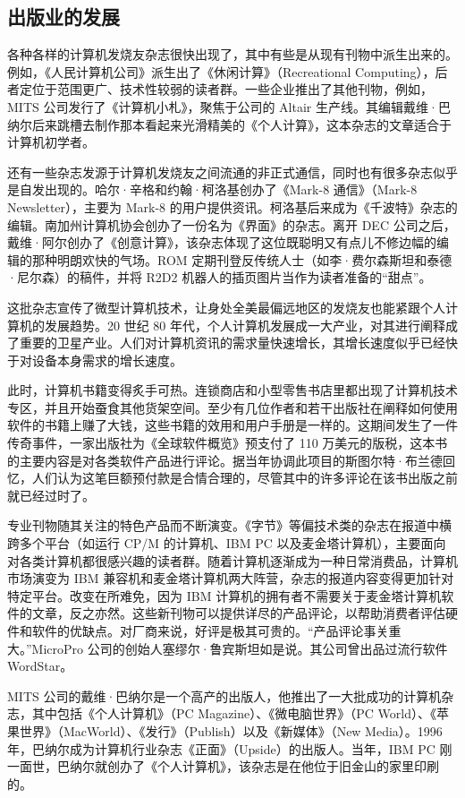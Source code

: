 \documentclass[12pt,UTF8]{ctexbook}
\begin{document}
\subsection{出版业的发展}


各种各样的计算机发烧友杂志很快出现了，其中有些是从现有刊物中派生出来的。例如，《人民计算机公司》派生出了《休闲计算》（Recreational Computing），后者定位于范围更广、技术性较弱的读者群。一些企业推出了其他刊物，例如，MITS 公司发行了《计算机小札》，聚焦于公司的 Altair 生产线。其编辑戴维·巴纳尔后来跳槽去制作那本看起来光滑精美的《个人计算》，这本杂志的文章适合于计算机初学者。

还有一些杂志发源于计算机发烧友之间流通的非正式通信，同时也有很多杂志似乎是自发出现的。哈尔·辛格和约翰·柯洛基创办了《Mark-8 通信》（Mark-8 Newsletter），主要为 Mark-8 的用户提供资讯。柯洛基后来成为《千波特》杂志的编辑。南加州计算机协会创办了一份名为《界面》的杂志。离开 DEC 公司之后，戴维·阿尔创办了《创意计算》，该杂志体现了这位既聪明又有点儿不修边幅的编辑的那种明朗欢快的气场。ROM 定期刊登反传统人士（如李·费尔森斯坦和泰德·尼尔森）的稿件，并将 R2D2 机器人的插页图片当作为读者准备的“甜点”。

这批杂志宣传了微型计算机技术，让身处全美最偏远地区的发烧友也能紧跟个人计算机的发展趋势。20 世纪 80 年代，个人计算机发展成一大产业，对其进行阐释成了重要的卫星产业。人们对计算机资讯的需求量快速增长，其增长速度似乎已经快于对设备本身需求的增长速度。

此时，计算机书籍变得炙手可热。连锁商店和小型零售书店里都出现了计算机技术专区，并且开始蚕食其他货架空间。至少有几位作者和若干出版社在阐释如何使用软件的书籍上赚了大钱，这些书籍的效用和用户手册是一样的。这期间发生了一件传奇事件，一家出版社为《全球软件概览》预支付了 110 万美元的版税，这本书的主要内容是对各类软件产品进行评论。据当年协调此项目的斯图尔特·布兰德回忆，人们认为这笔巨额预付款是合情合理的，尽管其中的许多评论在该书出版之前就已经过时了。

专业刊物随其关注的特色产品而不断演变。《字节》等偏技术类的杂志在报道中横跨多个平台（如运行 CP/M 的计算机、IBM PC 以及麦金塔计算机），主要面向对各类计算机都很感兴趣的读者群。随着计算机逐渐成为一种日常消费品，计算机市场演变为 IBM 兼容机和麦金塔计算机两大阵营，杂志的报道内容变得更加针对特定平台。改变在所难免，因为 IBM 计算机的拥有者不需要关于麦金塔计算机软件的文章，反之亦然。这些新刊物可以提供详尽的产品评论，以帮助消费者评估硬件和软件的优缺点。对厂商来说，好评是极其可贵的。“产品评论事关重大。”MicroPro 公司的创始人塞缪尔·鲁宾斯坦如是说。其公司曾出品过流行软件 WordStar。

MITS 公司的戴维·巴纳尔是一个高产的出版人，他推出了一大批成功的计算机杂志，其中包括《个人计算机》（PC Magazine）、《微电脑世界》（PC World）、《苹果世界》（MacWorld）、《发行》（Publish）以及《新媒体》（New Media）。1996 年，巴纳尔成为计算机行业杂志《正面》（Upside）的出版人。当年，IBM PC 刚一面世，巴纳尔就创办了《个人计算机》，该杂志是在他位于旧金山的家里印刷的。
\end{document}
